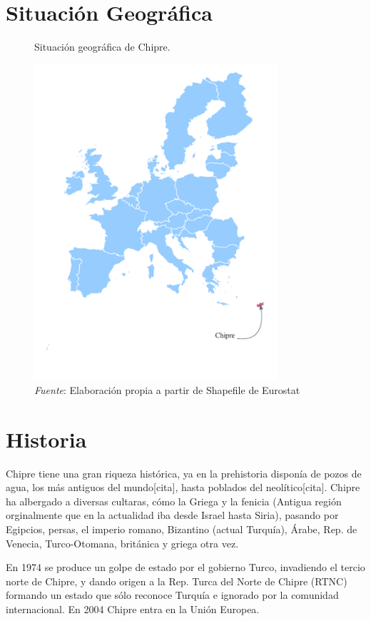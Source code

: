 \documentclass[a4paper,openright,12pt]{book}
\begin{document}
\section{Situación Geográfica}


\begin{figure}[htb]
    \centering
    \caption{Situación geográfica de Chipre.}
    \includegraphics[width=9cm]{mapa}
    \caption*{\textit{Fuente}: Elaboración propia a partir de Shapefile de Eurostat}
    \label{fig1}
\end{figure}

\section{Historia}

Chipre tiene una gran riqueza histórica, ya en la prehistoria disponía de pozos de agua, los más antiguos del mundo[cita], hasta poblados del neolítico[cita]. Chipre ha albergado a diversas cultaras, cómo la Griega y la fenicia (Antigua región orginalmente que en la actualidad iba desde Israel hasta Siria), pasando por Egipcios, persas, el imperio romano, Bizantino (actual Turquía), Árabe, Rep. de Venecia, Turco-Otomana, británica y griega otra vez.

En 1974 se produce un golpe de estado por el gobierno Turco, invadiendo el tercio norte de Chipre, y dando origen a la Rep. Turca del Norte de Chipre (RTNC) formando un estado que sólo reconoce Turquía e ignorado por la comunidad internacional. En 2004 Chipre entra en la Unión Europea.
\end{document}
